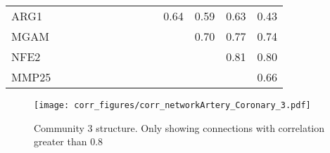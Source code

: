 \begin{longtable}{lrrrrrrrrrrrrr}
ARG1    &             &              &               &              &              &             &             &             &            &       0.64 &       0.59 &        0.63 &           0.43 \\
MGAM    &             &              &               &              &              &             &             &             &            &            &       0.70 &        0.77 &           0.74 \\
NFE2    &             &              &               &              &              &             &             &             &            &            &            &        0.81 &           0.80 \\
MMP25   &             &              &               &              &              &             &             &             &            &            &            &             &           0.66 \\
\end{longtable}


\begin{figure}[h!]
\centering
\texttt{[image: corr\_figures/corr\_networkArtery\_Coronary\_3.pdf]}
\caption{Community 3 structure. Only showing connections with correlation greater than 0.8}
\end{figure}




